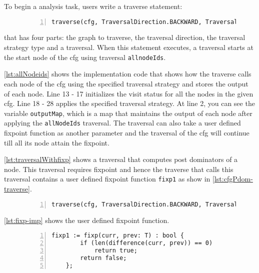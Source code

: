 

To begin a analysis task, users write a traverse statement:

\begin{figure}[ht!]
	\begin{lstlisting}[numbers=left, tabsize=4, escapechar=@,label={lst:traverse-syntax}] 
	traverse(cfg, TraversalDirection.BACKWARD, TraversalKind.DFS, allnodeIds);
	\end{lstlisting}
\end{figure}

that has four parts: the graph to traverse, the traversal direction, the traversal strategy type and a traversal. When this statement executes, a traversal starts at the start node of the cfg using traversal \lstinline|allnodeIds|. 

\ref{lst:allNodeids} shows the implementation code that shows how the traverse calls each node of the cfg using the specified traversal strategy and stores the output of each node.
Line 13 - 17 initializes the visit status for all the nodes in the given cfg. Line 18 - 28 applies the specified traversal strategy. At line 2, you can see the variable \lstinline|outputMap|, which is a map that maintains the output of each node after applying the \lstinline|allNodeIds| traversal.
The traversal can also take a user defined fixpoint function as another parameter and the traversal of the cfg will continue till all its node attain the fixpoint.
 
\ref{lst:traversalWithfixp} shows a traversal that computes post dominators of a node. This traversal requires fixpoint and hence the traverse that calls this traversal contains a user defined fixpoint function \lstinline|fixp1| as show in \ref{lst:cfgPdom-traverse}.

\begin{figure}
	\begin{lstlisting}[numbers=left, tabsize=4, escapechar=@,label={lst:cfgPdom-traverse}] 
	traverse(cfg, TraversalDirection.BACKWARD, TraversalKind.POSTORDER, cfgPdom, fixp1);
	\end{lstlisting}
\end{figure}

\ref{lst:fixp-imp} shows the user defined fixpoint function.

\begin{figure}
	\begin{lstlisting}[numbers=left, tabsize=4, escapechar=@,label={lst:fixp-imp}] 
	fixp1 := fixp(curr, prev: T) : bool {
		if (len(difference(curr, prev)) == 0)
			return true;	
		return false;
	};
	\end{lstlisting}
\end{figure}

